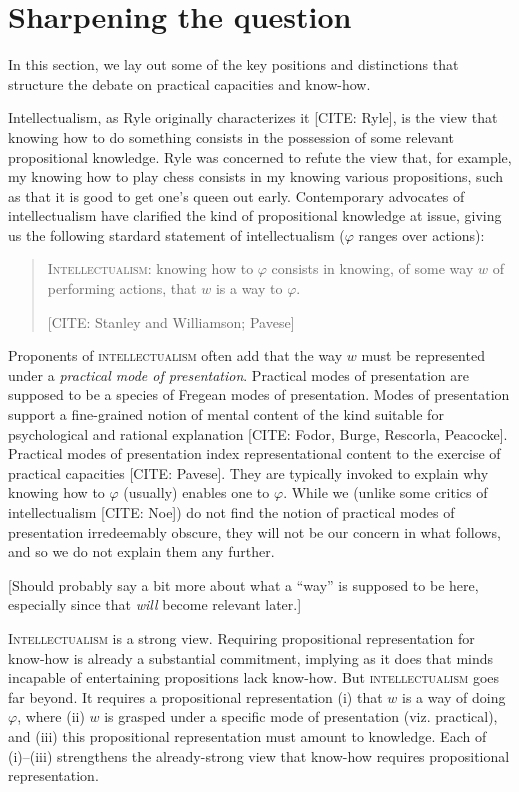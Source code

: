 \section{Sharpening the question}

In this section, we lay out some of the key positions and distinctions that structure the debate on practical capacities and know-how.

Intellectualism, as Ryle originally characterizes it [CITE: Ryle], is the view that knowing how to do something consists in the possession of some relevant propositional knowledge.
Ryle was concerned to refute the view that, for example, my knowing how to play chess consists in my knowing various propositions, such as that it is good to get one's queen out early.
Contemporary advocates of intellectualism have clarified the kind of propositional knowledge at issue, giving us the following stardard statement of intellectualism ($\varphi$ ranges over actions):
\begin{quote}
	\textsc{Intellectualism}: knowing how to $\varphi$ consists in knowing, of some way $w$ of performing actions, that $w$ is a way to $\varphi$.

	\hfill [CITE: Stanley and Williamson; Pavese]
\end{quote}
Proponents of \textsc{intellectualism} often add that the way $w$ must be represented under a \emph{practical mode of presentation}.
Practical modes of presentation are supposed to be a species of Fregean modes of presentation.
Modes of presentation support a fine-grained notion of mental content of the kind suitable for psychological and rational explanation [CITE: Fodor, Burge, Rescorla, Peacocke].
Practical modes of presentation index representational content to the exercise of practical capacities [CITE: Pavese].
They are typically invoked to explain why knowing how to $\varphi$ (usually) enables one to $\varphi$.
While we (unlike some critics of intellectualism [CITE: Noe]) do not find the notion of practical modes of presentation irredeemably obscure, they will not be our concern in what follows, and so we do not explain them any further.

[Should probably say a bit more about what a ``way'' is supposed to be here, especially since that \emph{will} become relevant later.]

\textsc{Intellectualism} is a strong view.
Requiring propositional representation for know-how is already a substantial commitment, implying as it does that minds incapable of entertaining propositions lack know-how.
But \textsc{intellectualism} goes far beyond.
It requires a propositional representation (i) that $w$ is a way of doing $\varphi$, where (ii) $w$ is grasped under a specific mode of presentation (viz. practical), and (iii) this propositional representation must amount to knowledge.
Each of (i)--(iii) strengthens the already-strong view that know-how requires propositional representation.

